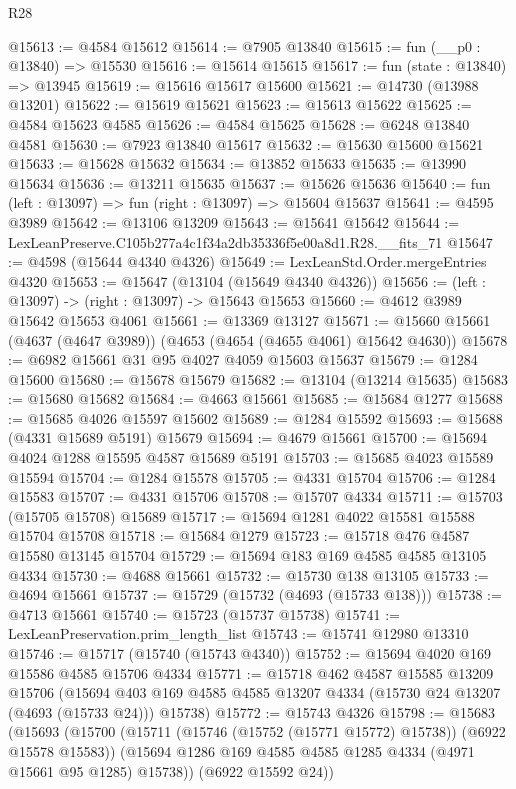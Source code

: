 \begin{lexlean}{R28}
\begin{coremodule}
@15613 := @4584 @15612
@15614 := @7905 @13840
@15615 := fun (__p0 : @13840) => @15530
@15616 := @15614 @15615
@15617 := fun (state : @13840) => @13945
@15619 := @15616 @15617 @15600
@15621 := @14730 (@13988 @13201)
@15622 := @15619 @15621
@15623 := @15613 @15622
@15625 := @4584 @15623 @4585
@15626 := @4584 @15625
@15628 := @6248 @13840 @4581
@15630 := @7923 @13840 @15617
@15632 := @15630 @15600 @15621
@15633 := @15628 @15632
@15634 := @13852 @15633
@15635 := @13990 @15634
@15636 := @13211 @15635
@15637 := @15626 @15636
@15640 := fun (left : @13097) => fun (right : @13097) => @15604 @15637
@15641 := @4595 @3989
@15642 := @13106 @13209
@15643 := @15641 @15642
@15644 := LexLeanPreserve.C105b277a4c1f34a2db35336f5e00a8d1.R28.__fits_71
@15647 := @4598 (@15644 @4340 @4326)
@15649 := LexLeanStd.Order.mergeEntries @4320
@15653 := @15647 (@13104 (@15649 @4340 @4326))
@15656 := (left : @13097) -> (right : @13097) -> @15643 @15653
@15660 := @4612 @3989 @15642 @15653 @4061
@15661 := @13369 @13127
@15671 := @15660 @15661 (@4637 (@4647 @3989)) (@4653 (@4654 (@4655 @4061) @15642 @4630))
@15678 := @6982 @15661 @31 @95 @4027 @4059 @15603 @15637
@15679 := @1284 @15600
@15680 := @15678 @15679
@15682 := @13104 (@13214 @15635)
@15683 := @15680 @15682
@15684 := @4663 @15661
@15685 := @15684 @1277
@15688 := @15685 @4026 @15597 @15602
@15689 := @1284 @15592
@15693 := @15688 (@4331 @15689 @5191) @15679
@15694 := @4679 @15661
@15700 := @15694 @4024 @1288 @15595 @4587 @15689 @5191
@15703 := @15685 @4023 @15589 @15594
@15704 := @1284 @15578
@15705 := @4331 @15704
@15706 := @1284 @15583
@15707 := @4331 @15706
@15708 := @15707 @4334
@15711 := @15703 (@15705 @15708) @15689
@15717 := @15694 @1281 @4022 @15581 @15588 @15704 @15708
@15718 := @15684 @1279
@15723 := @15718 @476 @4587 @15580 @13145 @15704
@15729 := @15694 @183 @169 @4585 @4585 @13105 @4334
@15730 := @4688 @15661
@15732 := @15730 @138 @13105
@15733 := @4694 @15661
@15737 := @15729 (@15732 (@4693 (@15733 @138)))
@15738 := @4713 @15661
@15740 := @15723 (@15737 @15738)
@15741 := LexLeanPreservation.prim_length_list
@15743 := @15741 @12980 @13310
@15746 := @15717 (@15740 (@15743 @4340))
@15752 := @15694 @4020 @169 @15586 @4585 @15706 @4334
@15771 := @15718
    @462
    @4587
    @15585
    @13209
    @15706
    (@15694 @403 @169 @4585 @4585 @13207 @4334 (@15730 @24 @13207 (@4693 (@15733 @24))) @15738)
@15772 := @15743 @4326
@15798 := @15683
    (@15693
      (@15700
        (@15711 (@15746 (@15752 (@15771 @15772) @15738)) (@6922 @15578 @15583))
        (@15694 @1286 @169 @4585 @4585 @1285 @4334 (@4971 @15661 @95 @1285) @15738))
      (@6922 @15592 @24))

\end{coremodule}
\end{lexlean}
